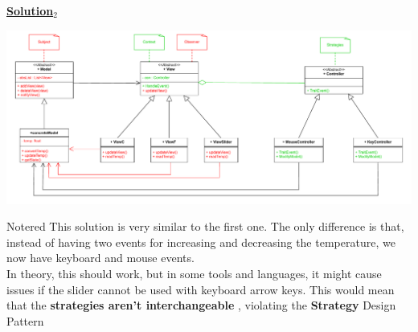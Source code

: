 \newpage
\textbf{\underline{Solution\(_2\)}}\\[0.1cm]
\begin{center}
    \includegraphics[height=0.22\textheight]{Exercices/EX1/ex1.2.drawio.pdf}
\end{center}


\vspace{0.25cm}

\begin{prettyBox}{Note}{red}
This solution is very similar to the first one. The only difference is that, instead of having two events 
for increasing and decreasing the temperature, we now have keyboard and mouse events. \\[0.15cm]
In theory, this should work, but in some tools and languages, it might cause issues if the slider 
cannot be used with keyboard arrow keys. This would mean that the \textbf{strategies aren't interchangeable} , violating
the \textbf{Strategy} Design Pattern
\end{prettyBox}

